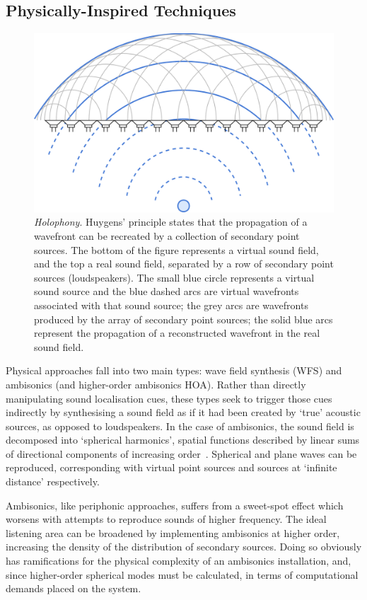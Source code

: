 \subsection{Physically-Inspired Techniques}\label{subsec:sound-field-synthesis}

\begin{figure}[ht]
    \centering
    \includegraphics[width=.75\textwidth]{figures/wfs_1}
    \caption{\textit{Holophony}.
    Huygens' principle states that the propagation of a wavefront
    can be recreated by a collection of secondary point sources.
    The bottom of the figure represents a virtual sound field, and the top a
    real sound field, separated by a row of secondary point sources
        (loudspeakers).
        The small blue circle represents a virtual sound source and the blue
        dashed arcs are virtual wavefronts associated with that sound source;
        the grey arcs are wavefronts produced by the array of secondary point
        sources;
        the solid blue arcs represent the propagation of a reconstructed
        wavefront in the real sound field.}
    \label{fig:wfs_1}
\end{figure}

Physical approaches fall into two main types: wave field synthesis (WFS) and
ambisonics (and higher-order ambisonics \textemdash{} HOA). Rather than
directly manipulating sound localisation cues, these types seek to trigger
those cues indirectly by synthesising a sound field as if it had been created
by `true' acoustic sources, as opposed to loudspeakers.
In the case of ambisonics, the sound field is decomposed into `spherical
harmonics', spatial functions described by linear sums of directional
components of increasing order~\citep{nicol_sound_2017}.
Spherical and plane waves can be reproduced, corresponding with virtual
point sources and sources at `infinite distance' respectively.

Ambisonics, like periphonic approaches, suffers from a sweet-spot effect which
worsens with attempts to reproduce sounds of higher frequency.
The ideal listening area can be broadened by implementing ambisonics at higher
order, increasing the density of the distribution of secondary sources.
Doing so obviously has ramifications for the physical complexity of an
ambisonics installation, and, since higher-order spherical modes must be
calculated, in terms of computational demands placed on the system.

